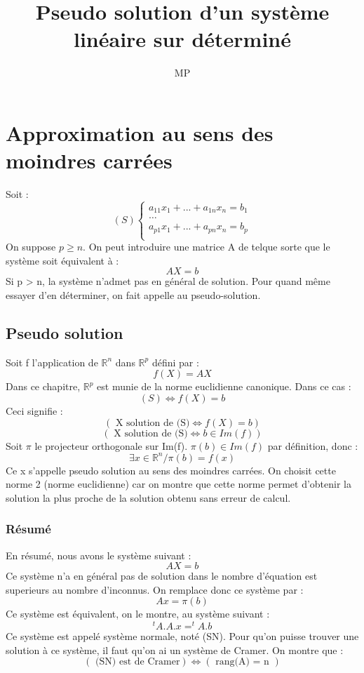 \documentclass[a4paper,12 pt,oneside]{report}     %
\title{Pseudo solution d'un système linéaire sur déterminé}
\author{MP}
\begin{document}
\maketitle
\tableofcontents
\chapter{Approximation au sens des moindres carrées}
Soit :
$$ (S) \begin{cases}
          a_{11}x_1 + ... + a_{1n}x_n = b_1 \\
	  \dots \\
	  a_{p1}x_1 + ... + a_{pn}x_n = b_p \\
          \end{cases}
$$
On suppose $p \geq n$. On peut introduire une matrice A de telque sorte que le système soit équivalent à : 
$$AX = b$$
Si p > n, la système n'admet pas en général de solution. Pour quand même essayer d'en déterminer, on fait appelle au pseudo-solution.
\section{Pseudo solution}
Soit f l'application de $\mathbb{R}^n$ dans $\mathbb{R}^p$ défini par :
$$f(X) = AX$$
Dans ce chapitre, $\mathbb{R}^p$ est munie de la norme euclidienne canonique. Dans ce cas :
$$(S) \Leftrightarrow f(X) = b$$
Ceci signifie : 
$$(\mbox{ X solution de (S)} \Leftrightarrow f(X) = b)$$
$$(\mbox{ X solution de (S)} \Leftrightarrow b \in Im(f))$$
Soit $\pi$ le projecteur orthogonale sur Im(f). $\pi(b) \in Im(f)$ par définition, donc :
$$\exists x \in \mathbb{R}^n / \pi(b) = f(x)$$
Ce x s'appelle pseudo solution au sens des moindres carrées. On choisit cette norme 2 (norme euclidienne) car on montre que cette norme permet d'obtenir la solution la plus proche de la solution obtenu sans erreur de calcul.
\subsection{Résumé}
En résumé, nous avons le système suivant : 
$$AX = b$$
Ce système n'a en général pas de solution dans le nombre d'équation est superieurs au nombre d'inconnus. On remplace donc ce système par : 
$$Ax = \pi(b)$$
Ce système est équivalent, on le montre, au système suivant : 
$$^tA.A.x = ^tA.b$$
Ce système est appelé système normale, noté (SN). Pour qu'on puisse trouver une solution à ce système, il faut qu'on ai un système de Cramer. On montre que : 
$$(\mbox{ (SN) est de Cramer}) \Leftrightarrow (\mbox{ rang(A) = n })$$
\end{document}
